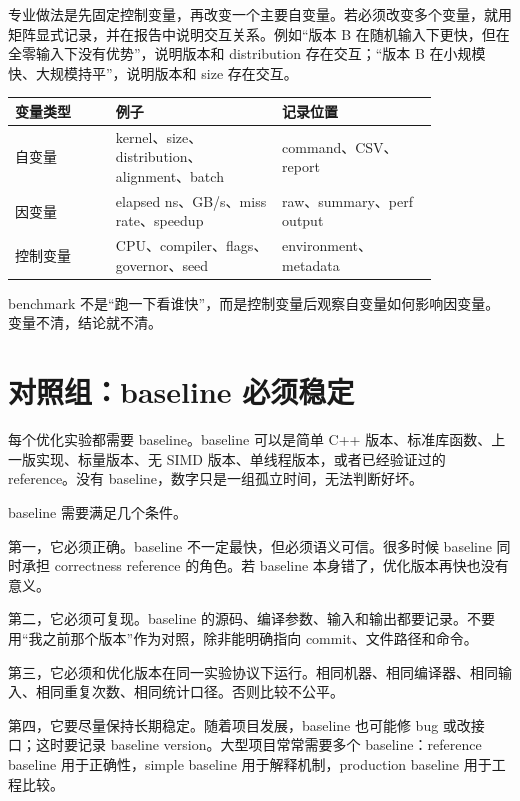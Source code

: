 专业做法是先固定控制变量，再改变一个主要自变量。若必须改变多个变量，就用矩阵显式记录，并在报告中说明交互关系。例如“版本 B 在随机输入下更快，但在全零输入下没有优势”，说明版本和 distribution 存在交互；“版本 B 在小规模快、大规模持平”，说明版本和 size 存在交互。

\begin{center}
\begin{tabular}{p{0.20\linewidth}p{0.33\linewidth}p{0.31\linewidth}}
\toprule
变量类型 & 例子 & 记录位置 \\
\midrule
自变量 & kernel、size、distribution、alignment、batch & command、CSV、report \\
因变量 & elapsed ns、GB/s、miss rate、speedup & raw、summary、perf output \\
控制变量 & CPU、compiler、flags、governor、seed & environment、metadata \\
\bottomrule
\end{tabular}
\end{center}

\begin{keyidea}
benchmark 不是“跑一下看谁快”，而是控制变量后观察自变量如何影响因变量。变量不清，结论就不清。
\end{keyidea}

\section{对照组：baseline 必须稳定}

每个优化实验都需要 baseline。baseline 可以是简单 C++ 版本、标准库函数、上一版实现、标量版本、无 SIMD 版本、单线程版本，或者已经验证过的 reference。没有 baseline，数字只是一组孤立时间，无法判断好坏。

baseline 需要满足几个条件。

第一，它必须正确。baseline 不一定最快，但必须语义可信。很多时候 baseline 同时承担 correctness reference 的角色。若 baseline 本身错了，优化版本再快也没有意义。

第二，它必须可复现。baseline 的源码、编译参数、输入和输出都要记录。不要用“我之前那个版本”作为对照，除非能明确指向 commit、文件路径和命令。

第三，它必须和优化版本在同一实验协议下运行。相同机器、相同编译器、相同输入、相同重复次数、相同统计口径。否则比较不公平。

第四，它要尽量保持长期稳定。随着项目发展，baseline 也可能修 bug 或改接口；这时要记录 baseline version。大型项目常常需要多个 baseline：reference baseline 用于正确性，simple baseline 用于解释机制，production baseline 用于工程比较。

